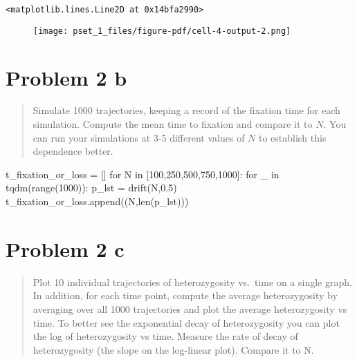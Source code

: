 \documentclass[
  letterpaper,
  DIV=11,
  numbers=noendperiod]{scrartcl}
\newenvironment{Shaded}{\begin{snugshade}}{\end{snugshade}}
\newcommand{\BuiltInTok}[1]{\textcolor[rgb]{0.00,0.23,0.31}{#1}}
\newcommand{\ControlFlowTok}[1]{\textcolor[rgb]{0.00,0.23,0.31}{#1}}
\newcommand{\DecValTok}[1]{\textcolor[rgb]{0.68,0.00,0.00}{#1}}
\newcommand{\FloatTok}[1]{\textcolor[rgb]{0.68,0.00,0.00}{#1}}
\newcommand{\KeywordTok}[1]{\textcolor[rgb]{0.00,0.23,0.31}{#1}}
\newcommand{\NormalTok}[1]{\textcolor[rgb]{0.00,0.23,0.31}{#1}}
\newcommand{\OperatorTok}[1]{\textcolor[rgb]{0.37,0.37,0.37}{#1}}
\begin{document}
\begin{verbatim}
<matplotlib.lines.Line2D at 0x14bfa2990>
\end{verbatim}

\begin{figure}[H]

{\centering \texttt{[image: pset\_1\_files/figure-pdf/cell-4-output-2.png]}

}

\end{figure}

\hypertarget{problem-2-b}{%
\section{Problem 2 b}\label{problem-2-b}}

\begin{quote}
Simulate 1000 trajectories, keeping a record of the fixation time for
each simulation. Compute the mean time to fixation and compare it to
\(N\). You can run your simulations at 3-5 different values of \(N\) to
establish this dependence better.
\end{quote}

\begin{Shaded}
\begin{Highlighting}[]
\NormalTok{t\_fixation\_or\_loss }\OperatorTok{=}\NormalTok{ []}
\ControlFlowTok{for}\NormalTok{ N }\KeywordTok{in}\NormalTok{ [}\DecValTok{100}\NormalTok{,}\DecValTok{250}\NormalTok{,}\DecValTok{500}\NormalTok{,}\DecValTok{750}\NormalTok{,}\DecValTok{1000}\NormalTok{]:}
    \ControlFlowTok{for}\NormalTok{ \_ }\KeywordTok{in}\NormalTok{ tqdm(}\BuiltInTok{range}\NormalTok{(}\DecValTok{1000}\NormalTok{)):}
\NormalTok{        p\_lst }\OperatorTok{=}\NormalTok{ drift(N,}\FloatTok{0.5}\NormalTok{)}
\NormalTok{        t\_fixation\_or\_loss.append((N,}\BuiltInTok{len}\NormalTok{(p\_lst)))}
\end{Highlighting}
\end{Shaded}

\hypertarget{problem-2-c}{%
\section{Problem 2 c}\label{problem-2-c}}

\begin{quote}
Plot 10 individual trajectories of heterozygosity vs.~time on a single
graph. In addition, for each time point, compute the average
heterozygosity by averaging over all 1000 trajectories and plot the
average heterozygosity vs time. To better see the exponential decay of
heterozygosity you can plot the log of heterozygosity vs time. Measure
the rate of decay of heterozygosity (the slope on the log-linear plot).
Compare it to N.
\end{quote}
\end{document}
